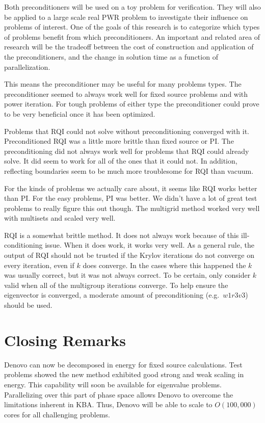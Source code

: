 Both preconditioners will be used on a toy problem for verification. They will also be applied to a large scale real PWR problem to investigate their influence on problems of interest. One of the goals of this research is to categorize which types of problems benefit from which preconditioners. An important and related area of research will be the tradeoff between the cost of construction and application of the preconditioners, and the change in solution time as a function of parallelization. 


This means the preconditioner may be useful for many problems types. The preconditioner seemed to always work well for fixed source problems and with power iteration. For tough problems of either type the preconditioner could prove to be very beneficial once it has been optimized.  

Problems that RQI could not solve without preconditioning converged with it. Preconditioned RQI was a little more brittle than fixed source or PI. The preconditioning did not always work well for problems that RQI could already solve. It did seem to work for all of the ones that it could not. In addition, reflecting boundaries seem to be much more troublesome for RQI than vacuum. 

For the kinds of problems we actually care about, it seems like RQI works better than PI. For the easy problems, PI was better. We didn't have a lot of great test problems to really figure this out though. The multigrid method worked very well with multisets and scaled very well. 

RQI is a somewhat brittle method. It does not always work because of this ill-conditioning issue. When it does work, it works very well. As a general rule, the output of RQI should not be trusted if the Krylov iterations do not converge on every iteration, even if $k$ does converge. In the cases where this happened the $k$ was usually correct, but it was not always correct. To be certain, only consider $k$ valid when all of the multigroup iterations converge. To help ensure the eigenvector is converged, a moderate amount of preconditioning (e.g.\ $w1r3v3$) should be used. 

\section{Closing Remarks}
Denovo can now be decomposed in energy for fixed source calculations. Test problems showed the new method exhibited good strong and weak scaling in energy. This capability will soon be available for eigenvalue problems. Parallelizing over this part of phase space allows Denovo to overcome the limitations inherent in KBA. Thus, Denovo will be able to scale to $O(100,000)$ cores for all challenging problems. 

